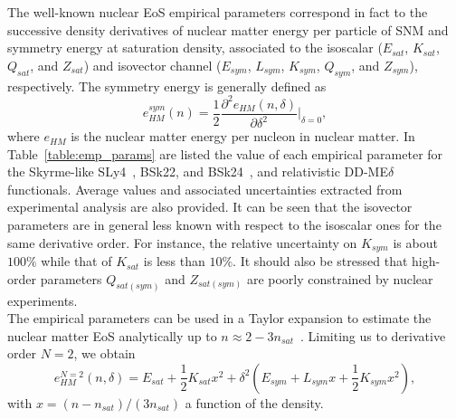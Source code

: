 %
The well-known nuclear EoS empirical parameters correspond in fact to the 
successive density derivatives of nuclear matter energy per particle of SNM 
and symmetry energy at saturation density, associated to the isoscalar
($E_{sat}$, $K_{sat}$, $Q_{sat}$, and $Z_{sat}$) and isovector channel ($E_{sym}$,
$L_{sym}$, $K_{sym}$, $Q_{sym}$, and $Z_{sym}$), respectively. 
The symmetry energy is generally defined as
%
\begin{equation}
  e_{HM}^{sym}(n) = \frac{1}{2}\frac{\partial^2 e_{HM}(n,\delta)}{\partial
  \delta^2}\bigg|_{\delta=0},\label{eq:esym}
\end{equation}
%
where $e_{HM}$ is the nuclear matter energy per nucleon in nuclear matter. In
Table~\ref{table:emp_params} are listed the value of each empirical parameter
for the Skyrme-like SLy4~\cite{Chabanat1998}, BSk22, and
BSk24~\cite{Goriely2013}, and relativistic
DD-ME$\delta$~\cite{RocaMaza2011} functionals. Average values and associated
uncertainties extracted from experimental analysis are also provided. It can be
seen that the isovector parameters are in general less known with respect to
the isoscalar ones for the same derivative order. For instance, the relative
uncertainty on $K_{sym}$ is about $100\%$ while that of $K_{sat}$ is less than
$10\%$. It should also be stressed that high-order parameters $Q_{sat(sym)}$
and $Z_{sat(sym)}$ are poorly constrained by nuclear experiments.\\
The empirical parameters can be used in a Taylor expansion to estimate the
nuclear matter EoS analytically up to 
$n \approx 2-3n_{sat}$~\cite{Margueron2018a,Margueron2018b}. Limiting us to 
derivative order $N=2$, we obtain
%
\begin{equation}
  e^{N=2}_{HM}(n,\delta) = E_{sat} + \frac{1}{2}K_{sat}x^2 
  + \delta^2 (E_{sym} + L_{sym}x +\frac{1}{2}K_{sym}x^2),
\end{equation}
%
with $x = (n-n_{sat})/(3n_{sat})$ a function of the density.

